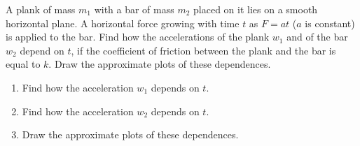 \item A plank of mass $m_1$ with a bar of mass $m_2$ placed on it lies on a smooth horizontal plane. A horizontal force growing with time $t$ as $F = at$ ($a$ is constant) is applied to the bar. Find how the accelerations of the plank $w_1$ and of the bar $w_2$ depend on $t$, if the coefficient of friction between the plank and the bar is equal to $k$. Draw the approximate plots of these dependences.
    \begin{center}
    \end{center}
    \begin{enumerate}
        \item Find how the acceleration $w_1$ depends on $t$.
        \item Find how the acceleration $w_2$ depends on $t$.
        \item Draw the approximate plots of these dependences.
    \end{enumerate}